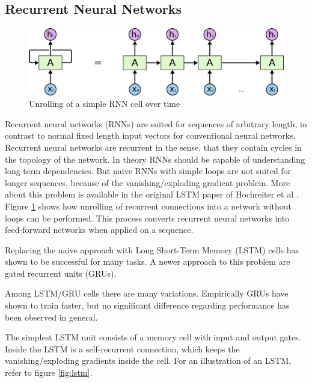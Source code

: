 \documentclass[draft,final,oneside]{vutinfth} %
\begin{document}
\subsection{Recurrent Neural Networks} \label{lstmbackground}

\begin{figure}[ht]
	\centering
  	\includegraphics[width=1.0\textwidth]{graphics/rnn.png}
	\caption{Unrolling of a simple RNN cell over time \cite{colahlstm}}
	\label{fig:rnn}
\end{figure}

Recurrent neural networks (RNNs) are suited for sequences of arbitrary length, in contrast to normal fixed length input vectors for conventional neural networks. Recurrent neural networks are recurrent in the sense, that they contain cycles in the topology of the network. In theory RNNs should be capable of understanding long-term dependencies. But naive RNNs with simple loops are not suited for longer sequences, because of the vanishing/exploding gradient problem. More about this problem is available in the original LSTM paper of Hochreiter et al \cite{hochreiter}. Figure \ref{fig:rnn} shows how unrolling of recurrent connections into a network without loops can be performed. This process converts  recurrent neural networks into feed-forward networks when applied on a sequence.

Replacing the naive approach with Long Short-Term Memory (LSTM) cells has shown to be successful for many tasks. A newer approach to this problem are gated recurrent units (GRUs). \cite{gru}

Among LSTM/GRU cells there are many variations. Empirically GRUs have shown to train faster, but no significant difference regarding performance has been observed in general.

The simplest LSTM unit consists of a memory cell with input and output gates. Inside the LSTM is a self-recurrent connection, which keeps the vanishing/exploding gradients inside the cell. For an illustration of an LSTM, refer to figure \ref{fig:lstm}.
\end{document}
